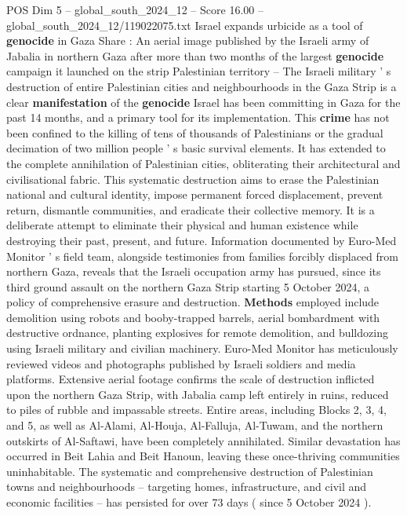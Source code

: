\begin{textsample}{POS Dim 5 – global\_south\_2024\_12 – Score 16.00 – global\_south\_2024\_12/119022075.txt}  \label{ex:f5_pos_056}
Israel expands urbicide as a tool of \textbf{genocide} in Gaza Share : An aerial image published by the Israeli army of Jabalia in northern Gaza after more than two months of the largest \textbf{genocide} campaign it launched on the strip Palestinian territory -- The Israeli military ' s destruction of entire Palestinian cities and neighbourhoods in the Gaza Strip is a clear \textbf{manifestation} of the \textbf{genocide} Israel has been committing in Gaza for the past 14 months, and a primary tool for its implementation.
This \textbf{crime} has not been confined to the killing of tens of thousands of Palestinians or the gradual decimation of two million people ' s basic survival elements.
It has extended to the complete annihilation of Palestinian cities, obliterating their architectural and civilisational fabric.
This systematic destruction aims to erase the Palestinian national and cultural identity, impose permanent forced displacement, prevent return, dismantle communities, and eradicate their collective memory.
It is a deliberate attempt to eliminate their physical and human existence while destroying their past, present, and future.
Information documented by Euro-Med Monitor ' s field team, alongside testimonies from families forcibly displaced from northern Gaza, reveals that the Israeli occupation army has pursued, since its third ground assault on the northern Gaza Strip starting 5 October 2024, a policy of comprehensive erasure and destruction. \textbf{Methods} employed include demolition using robots and booby-trapped barrels, aerial bombardment with destructive ordnance, planting explosives for remote demolition, and bulldozing using Israeli military and civilian machinery.
Euro-Med Monitor has meticulously reviewed videos and photographs published by Israeli soldiers and media platforms.
Extensive aerial footage confirms the scale of destruction inflicted upon the northern Gaza Strip, with Jabalia camp left entirely in ruins, reduced to piles of rubble and impassable streets.
Entire areas, including Blocks 2, 3, 4, and 5, as well as Al-Alami, Al-Houja, Al-Falluja, Al-Tuwam, and the northern outskirts of Al-Saftawi, have been completely annihilated.
Similar devastation has occurred in Beit Lahia and Beit Hanoun, leaving these once-thriving communities uninhabitable.
The systematic and comprehensive destruction of Palestinian towns and neighbourhoods -- targeting homes, infrastructure, and civil and economic facilities -- has persisted for over 73 days ( since 5 October 2024 ).

\end{textsample}
